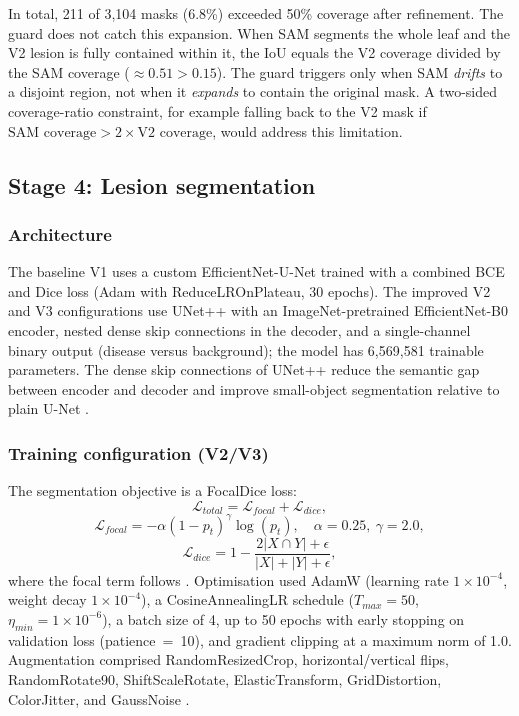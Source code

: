 \documentclass[final,5p,times,twocolumn,authoryear]{elsarticle}
\begin{document}
In total, 211 of 3{,}104 masks (6.8\%) exceeded 50\% coverage after refinement. The guard does not catch this expansion. When SAM segments the whole leaf and the V2 lesion is fully contained within it, the IoU equals the V2 coverage divided by the SAM coverage ($\approx0.51 > 0.15$). The guard triggers only when SAM \emph{drifts} to a disjoint region, not when it \emph{expands} to contain the original mask. A two-sided coverage-ratio constraint, for example falling back to the V2 mask if $\text{SAM coverage} > 2\times\text{V2 coverage}$, would address this limitation.

\subsection{Stage 4: Lesion segmentation}

\subsubsection{Architecture}

The baseline V1 uses a custom EfficientNet-U-Net trained with a combined BCE and Dice loss (Adam with ReduceLROnPlateau, 30 epochs). The improved V2 and V3 configurations use UNet++ \citep{zhou2018unet++} with an ImageNet-pretrained EfficientNet-B0 encoder, nested dense skip connections in the decoder, and a single-channel binary output (disease versus background); the model has 6{,}569{,}581 trainable parameters. The dense skip connections of UNet++ reduce the semantic gap between encoder and decoder and improve small-object segmentation relative to plain U-Net \citep{ronneberger2015unet}.

\subsubsection{Training configuration (V2/V3)}

The segmentation objective is a FocalDice loss:
\begin{equation}
\mathcal{L}_{total} = \mathcal{L}_{focal} + \mathcal{L}_{dice},
\end{equation}
\begin{equation}
\mathcal{L}_{focal} = -\alpha(1-p_t)^\gamma \log(p_t), \quad \alpha=0.25,\ \gamma=2.0,
\end{equation}
\begin{equation}
\mathcal{L}_{dice} = 1 - \frac{2|X \cap Y| + \epsilon}{|X| + |Y| + \epsilon},
\end{equation}
where the focal term follows \citet{lin2017focal}. Optimisation used AdamW \citep{loshchilov2019decoupled} (learning rate $1\times10^{-4}$, weight decay $1\times10^{-4}$), a CosineAnnealingLR schedule ($T_{max}=50$, $\eta_{min}=1\times10^{-6}$), a batch size of 4, up to 50 epochs with early stopping on validation loss (patience~=~10), and gradient clipping at a maximum norm of 1.0. Augmentation comprised RandomResizedCrop, horizontal/vertical flips, RandomRotate90, ShiftScaleRotate, ElasticTransform, GridDistortion, ColorJitter, and GaussNoise \citep{buslaev2020albumentations}.
\end{document}
